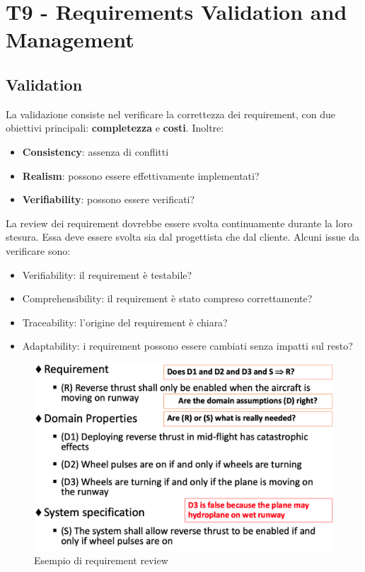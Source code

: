 \documentclass[11pt]{article}
\begin{document}
\section{T9 - Requirements Validation and Management}
\subsection{Validation}
La validazione consiste nel verificare la correttezza dei requirement, con due obiettivi principali: \textbf{completezza} e \textbf{costi}. Inoltre:
\begin{itemize}
    \item \textbf{Consistency}: assenza di conflitti
    \item \textbf{Realism}: possono essere effettivamente implementati?
    \item \textbf{Verifiability}: possono essere verificati?
\end{itemize}
La review dei requirement dovrebbe essere svolta continuamente durante la loro stesura. Essa deve essere svolta sia dal progettista che dal cliente. Alcuni issue da verificare sono:
\begin{itemize}
    \item Verifiability: il requirement è testabile?
    \item Comprehensibility: il requirement è stato compreso correttamente?
    \item Traceability: l'origine del requirement è chiara?
    \item Adaptability: i requirement possono essere cambiati senza impatti sul resto?
\end{itemize}
\begin{figure}[H]
    \centering
    \includegraphics[width=\linewidth]{res/teoria/RequirementReview.png}
    \caption{Esempio di requirement review}
\end{figure}
\end{document}
